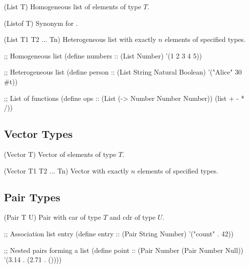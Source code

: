 \begin{typespec}{(List T)}
Homogeneous list of elements of type $T$.
\end{typespec}

\begin{typespec}{(Listof T)}
Synonym for .
\end{typespec}

\begin{typespec}{(List T1 T2 ... Tn)}
Heterogeneous list with exactly $n$ elements of specified types.
\end{typespec}

\begin{example}
\begin{lambdustcode}
;; Homogeneous list
(define numbers :: (List Number) '(1 2 3 4 5))

;; Heterogeneous list  
(define person :: (List String Natural Boolean)
  '("Alice" 30 #t))

;; List of functions
(define ops :: (List (-> Number Number Number))
  (list + - * /))
\end{lambdustcode}
\end{example}

\subsection{Vector Types}
\label{subsec:vector-types}

\begin{typespec}{(Vector T)}
Vector of elements of type $T$.
\end{typespec}

\begin{typespec}{(Vector T1 T2 ... Tn)}
Vector with exactly $n$ elements of specified types.
\end{typespec}

\subsection{Pair Types}
\label{subsec:pair-types}

\begin{typespec}{(Pair T U)}
Pair with car of type $T$ and cdr of type $U$.
\end{typespec}

\begin{example}
\begin{lambdustcode}
;; Association list entry
(define entry :: (Pair String Number) '("count" . 42))

;; Nested pairs forming a list  
(define point :: (Pair Number (Pair Number Null))
  '(3.14 . (2.71 . ())))
\end{lambdustcode}
\end{example}

